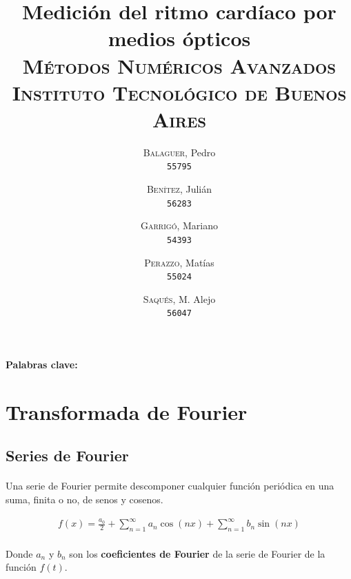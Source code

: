 \documentclass[12pt, twocolumn]{article}
\begin{document}
	\title{Medición del ritmo cardíaco por medios ópticos\\ 
		   \large{\textsc{Métodos Numéricos Avanzados}} \\
		   \normalsize{\textsc{Instituto Tecnológico de Buenos Aires}}}
	\author{
		\textsc{Balaguer}, Pedro \\
		\texttt{55795}
		\and
		\textsc{Benítez}, Julián \\
		\texttt{56283}
		\and
		\textsc{Garrigó}, Mariano \\
		\texttt{54393}
		\and
		\textsc{Perazzo}, Matías \\
		\texttt{55024}
		\and
		\textsc{Saqués}, M. Alejo \\
		\texttt{56047} 
	}
	\date{}
	\maketitle
	
	\begin{abstract}

	\end{abstract}
	
	\paragraph{Palabras clave:}
	
	\section{Transformada de Fourier}
	
	\subsection{Series de Fourier}
	
	\paragraph{} Una serie de Fourier permite descomponer cualquier función periódica en una suma, finita o no, de senos y cosenos.
	
	\begin{align}
		f(x) = \frac{a_{0}}{2} + \sum^{\infty}_{n=1}a_{n}\cos(nx) + \sum^{\infty}_{n=1}b_{n}\sin(nx)
	\end{align}
	
	\paragraph{} Donde $a_{n}$ y $b_{n}$ son los \textbf{coeficientes de Fourier} de la serie de Fourier de la función $f(t)$.
	
\end{document}
